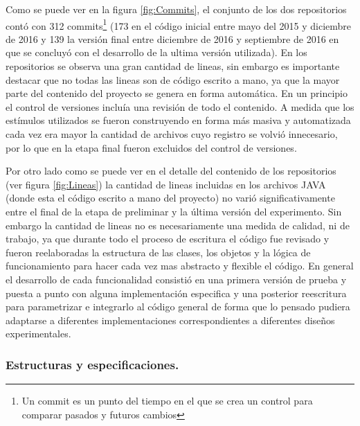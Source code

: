 \documentclass{article}
\numberwithin{figure}{section}
\begin{document}
    Como se puede ver en la figura \ref{fig:Commits}, el conjunto de los dos repositorios contó con 312 commits\footnote{Un commit es un punto del tiempo en el que se crea un control para comparar pasados y futuros cambios} (173 en el código inicial entre mayo del 2015 y diciembre de 2016 y 139 la versión final entre diciembre de 2016 y septiembre de 2016 en que se concluyó con el desarrollo de la ultima versión utilizada). En los repositorios se observa una gran cantidad de lineas, sin embargo es importante destacar que no todas las lineas son de código escrito a mano, ya que la mayor parte del contenido del proyecto se genera en forma automática. En un principio el control de versiones incluía una revisión de todo el contenido. A medida que los estímulos utilizados se fueron construyendo en forma más masiva y automatizada cada vez era mayor la cantidad de archivos cuyo registro se volvió innecesario, por lo que en la etapa final fueron excluidos del control de versiones. 
    
    Por otro lado como se puede ver en el detalle del contenido de los repositorios (ver figura \ref{fig:Lineas}) la cantidad de lineas incluidas en los archivos JAVA (donde esta el código escrito a mano del proyecto) no varió significativamente entre el final de la etapa de preliminar y la última versión del experimento. Sin embargo la cantidad de lineas no es necesariamente una medida de calidad, ni de trabajo, ya que durante todo el proceso de escritura el código fue revisado y fueron reelaboradas la estructura de las clases, los objetos y la lógica de funcionamiento para hacer cada vez mas abstracto y flexible el código. En general el desarrollo de cada funcionalidad consistió en una primera versión de prueba y puesta a punto con alguna implementación especifica y una posterior reescritura para parametrizar e integrarlo al código general de forma que lo pensado pudiera adaptarse a diferentes implementaciones correspondientes a diferentes diseños experimentales. 
    
    \subsubsection{Estructuras y especificaciones.}
    
\end{document}
